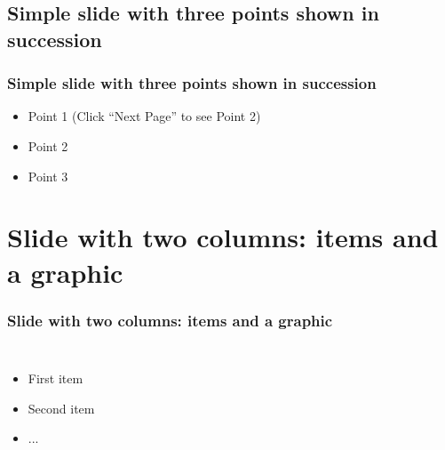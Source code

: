 \documentclass[blue]{beamer}
\begin{document}
\subsection{Simple slide with three points shown in succession}

\begin{frame}
  \frametitle{Simple slide with three points shown in succession}   %

  \begin{itemize}
  \item<1-> Point 1 (Click ``Next Page'' to see Point 2) %
  \item<2-> Point 2  %
  \item<3-> Point 3
  \end{itemize}
\end{frame}


\section{Slide with two columns: items and a graphic}

\begin{frame}
  \frametitle{Slide with two columns: items and a graphic}   %
  \begin{columns}[c]
  \column{2in}  %
  \begin{itemize}
  \item<1-> First item
  \item<2-> Second item
  \item<3-> ...
  \end{itemize}
  \column{2in}
  \end{columns}
\end{frame}
\end{document}
